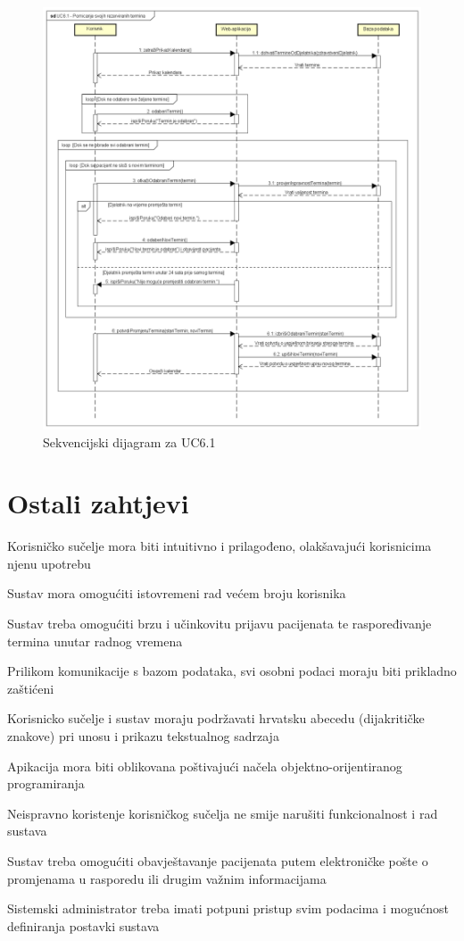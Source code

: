 \begin{figure}[H]
	\includegraphics[scale=0.5]{slike/UC6.1_Pomicanje_svojih_rezerviranih_termina}
	\centering
	\caption{Sekvencijski dijagram za UC6.1}
\end{figure}

\section{Ostali zahtjevi}

\begin{packed_item}
	\item Korisničko sučelje mora biti intuitivno i prilagođeno, olakšavajući korisnicima njenu upotrebu
	\item Sustav mora omogućiti istovremeni rad većem broju korisnika
	\item Sustav treba omogućiti brzu i učinkovitu prijavu pacijenata te raspoređivanje termina unutar radnog vremena
	\item Prilikom komunikacije s bazom podataka, svi osobni podaci moraju biti prikladno zaštićeni
	\item Korisnicko sučelje i sustav moraju podržavati hrvatsku abecedu (dijakritičke znakove) pri unosu i prikazu tekstualnog sadrzaja 
	\item Apikacija mora biti oblikovana poštivajući načela objektno-orijentiranog programiranja
	\item Neispravno koristenje korisničkog sučelja ne smije narušiti funkcionalnost i rad sustava
	\item Sustav treba omogućiti obavještavanje pacijenata putem elektroničke pošte o promjenama u rasporedu ili drugim važnim informacijama
	\item Sistemski administrator treba imati potpuni pristup svim podacima i mogućnost definiranja postavki sustava
\end{packed_item}


			 
			 
	